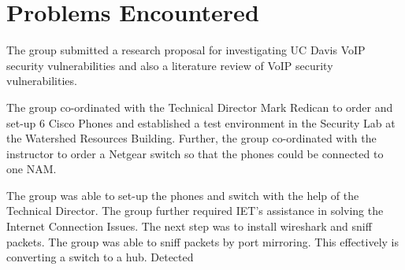 \section{Problems Encountered}


The group submitted a research proposal for investigating UC Davis VoIP security vulnerabilities and also a literature review of VoIP security vulnerabilities.

 The group co-ordinated with the Technical Director Mark Redican to order and set-up 6 Cisco Phones and established a test environment in the Security Lab at the Watershed Resources Building. Further, the group co-ordinated with the instructor to order a Netgear switch so that the phones could be connected to one NAM.
 
 The group was able to set-up the phones and switch with the help of the Technical Director. The group further required IET's assistance in solving the Internet Connection Issues. 
 The next step was to install wireshark and sniff packets. The group was able to sniff packets by port mirroring. This effectively is converting a switch to a hub. Detected 
 
